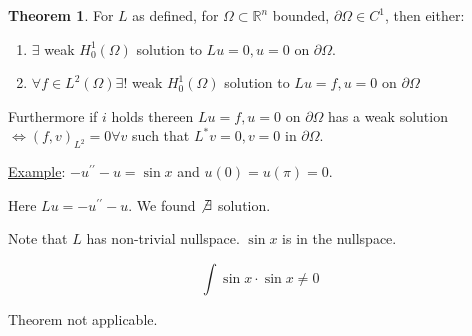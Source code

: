 \documentclass{article}
\theoremstyle{definition}
\newtheorem{theorem}{Theorem}
\begin{document}
\begin{theorem}
    For \(L\) as defined, for \(\Omega \subset \mathbb{R}^n\) bounded, \(\partial \Omega \in C^1\), then either:

    \begin{enumerate}[label=\roman*)]
        \item \(\exists\) weak \(H^1_0(\Omega)\) solution to \(Lu = 0, u = 0\) on \(\partial \Omega\).
        \item \(\forall f\in L^2(\Omega) \exists !\) weak \(H^1_0(\Omega)\) solution to \(Lu = f, u = 0\) on \(\partial \Omega\)
    \end{enumerate} 

    Furthermore if \(i\) holds thereen \(Lu = f, u = 0\) on \(\partial \Omega\) has a weak solution \(\iff (f,v)_{L^2}= 0 \forall v\) such that \(L^{\ast} v = 0, v = 0\) in \(\partial \Omega\).
\end{theorem}

\underline{Example}: \(-u^{\prime\prime} - u = \sin x\) and \(u(0)=u(\pi)=0\).

Here \(L u = - u^{\prime\prime} - u\). We found \(\not\exists\) solution.

Note that \(L\) has non-trivial nullspace. \(\sin x\) is in the nullspace.

\[
    \int \sin x\cdot \sin x \neq 0
\]

Theorem not applicable.
\end{document}
